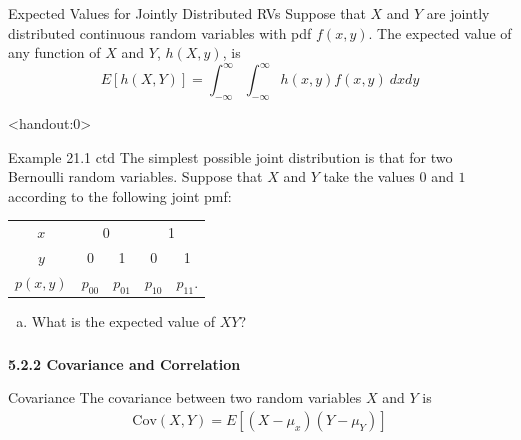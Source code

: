 \begin{frame}
  \begin{block}{Expected Values for Jointly Distributed RVs}
    Suppose that $X$ and $Y$ are jointly distributed continuous random variables with pdf $f(x,y)$. The expected value of any function of $X$ and $Y$, $h(X,y)$, is
    \[
      E[h(X,Y)]=\int_{-\infty}^\infty \int_{-\infty}^\infty h(x,y) f(x,y)~dxdy 
    \]
  \end{block}
\end{frame}

\begin{frame}<handout:0>
  \begin{block}{Example 21.1 ctd}
    The simplest possible joint distribution is that for two Bernoulli random variables. Suppose that $X$ and $Y$ take the values $0$ and $1$ according to the following joint pmf:

    \begin{center}
      \begin{tabular}{c|cccc}
        $x$ & \multicolumn{2}{c}{0} & \multicolumn{2}{c}{1}\\
        $y$ & 0 & 1 & 0 & 1\\
        \hline
        $p(x,y)$ & $p_{00}$ & $p_{01}$ & $p_{10}$ & $p_{11}$.
      \end{tabular}
    \end{center}

    \begin{enumerate}[a)]
    \item What is the expected value of $XY$?
    \end{enumerate}
    
  \end{block}
\end{frame}

\begin{frame}
  \frametitle{}
  
  \begin{center}
    \Large{\textbf{5.2.2 Covariance and Correlation}}
  \end{center}
  
\end{frame}


\begin{frame}
  \begin{block}{Covariance}
    The covariance between two random variables $X$ and $Y$ is
    \begin{align*}
      \mbox{Cov}(X,Y)
      =E[(X-\mu_x)(Y-\mu_Y)]\\
    \end{align*}
  \end{block}
\end{frame}

